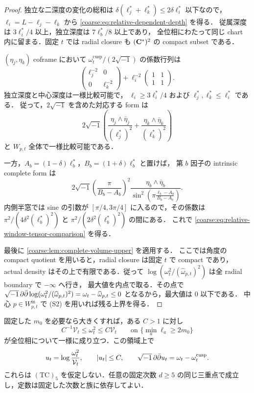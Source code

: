 \begin{proof}
独立な二深度の変化の総和は
$\delta(\ell_j^*+\ell_k^*)\le2\delta\ell_i^*$ 以下なので，
$\ell_i=L-\ell_j-\ell_k$ から
\eqref{coarse:eq:relative-dependent-depth} を得る．
従属深度は $3\ell_i^*/4$ 以上，独立深度は $7\ell_b^*/8$ 以上であり，
全位相にわたって同じ chart 内に留まる．固定 $t$ では radial closure も
$(\mathbf C^*)^2$ の compact subset である．

$(\eta_j,\eta_k)$ coframe において
$\omega_t^{\mathrm{cusp}}/(2\sqrt{-1})$ の係数行列は
\[
 \begin{pmatrix}\ell_j^{-2}&0\\0&\ell_k^{-2}\end{pmatrix}
 +\ell_i^{-2}
     \begin{pmatrix}1&1\\1&1\end{pmatrix}.
\]
独立深度と中心深度は一様比較可能で，
$\ell_i\ge3\ell_i^*/4$ および $\ell_j^*,\ell_k^*\le\ell_i^*$ である．
従って，$2\sqrt{-1}$ を含めた対応する form は
\[
 2\sqrt{-1}\left(
   \frac{\eta_j\wedge\bar\eta_j}{(\ell_j^*)^2}
   +\frac{\eta_k\wedge\bar\eta_k}{(\ell_k^*)^2}\right)
\]
と $W_{p,t}$ 全体で一様比較可能である．

一方，$A_b=(1-\delta)\ell_b^*$，$B_b=(1+\delta)\ell_b^*$ と置けば，
第 $b$ 因子の intrinsic complete form は
\[
 2\sqrt{-1}
 \left(\frac{\pi}{B_b-A_b}\right)^2
 \frac{\eta_b\wedge\bar\eta_b}
 {\sin^2\!\left(\pi\frac{\ell_b-A_b}{B_b-A_b}\right)}.
\]
内側半窓では sine の引数が $[\pi/4,3\pi/4]$ に入るので，その係数は
$\pi^2/(4\delta^2(\ell_b^*)^2)$ と
$\pi^2/(2\delta^2(\ell_b^*)^2)$ の間にある．
これで \eqref{coarse:eq:relative-window-tensor-comparison} を得る．

最後に \cref{coarse:lem:complete-volume-upper} を適用する．
ここでは角度の compact quotient を用いると，radial closure は固定 $t$ で compact であり，
actual density はその上で有限である．従って
$\log(\omega_t^2/(\widehat\omega_{p,t})^2)$ は全 radial boundary で $-\infty$ へ行き，
最大値を内点で取る．その点で
$\sqrt{-1}\,\partial\bar\partial\log(\omega_t^2/(\widehat\omega_{p,t})^2)
=\omega_t-\widehat\omega_{p,t}\le0$ となるから，最大値は $0$ 以下である．
中心 $p\in W_{p,t}^{\mathrm{in}}$ で (S2) を用いれば残る上界を得る．
\end{proof}

\begin{corollary}
\label{coarse:cor:triple-volume-comparison}
固定した $m_0$ を必要なら大きくすれば，ある $C>1$ に対し
\begin{equation}\label{coarse:eq:full-triple-volume-comparison}
 C^{-1}\mathcal V_t\le\omega_t^2\le C\mathcal V_t
 \qquad\text{on }\{\min_a\ell_a\ge2m_0\}
\end{equation}
が全位相について一様に成り立つ．この領域上で
\begin{equation}\label{coarse:eq:full-triple-bounded-potential}
 u_t=\log\frac{\omega_t^2}{\mathcal V_t},
 \qquad |u_t|\le C,
 \qquad
 \sqrt{-1}\,\partial\bar\partial u_t=\omega_t-\omega_t^{\mathrm{cusp}}.
\end{equation}
これらは $\mathrm{(TC)}_5$ を仮定しない．任意の固定次数 $d\ge5$ の同じ三重点で成立し，定数は固定した次数と族に依存してよい．
\end{corollary}

